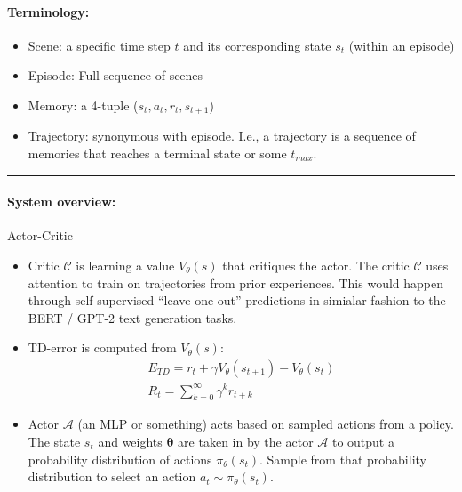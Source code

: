 \documentclass[11pt]{article}
\newcommand{\suml}{\sum\limits}
\begin{document}
\lhead{}
\rhead{}


\paragraph*{Terminology: }
\begin{itemize}
  \item Scene: a specific time step $t$ and its corresponding state $s_t$ (within an episode)
  \item Episode: Full sequence of scenes
  \item Memory: a 4-tuple ($s_t, a_t, r_t, s_{t+1}$)
  \item Trajectory: synonymous with episode. I.e., a trajectory is a sequence of memories that reaches a terminal state or some $t_{max}$.  
\end{itemize}

\hrule

\paragraph{System overview:} 

Actor-Critic  

\begin{itemize}
  \item Critic $\mathcal{C}$ is learning a value $V_\theta (s)$ that critiques the actor. The critic $\mathcal{C}$ uses attention to train on trajectories from prior experiences. This would happen through self-supervised ``leave one out'' predictions in simialar fashion to the BERT / GPT-2 text generation tasks.  
  \item TD-error is computed from $V_\theta (s)$:
    \begin{gather*}
      E_{TD} = r_t + \gamma V_\theta(s_{t+1}) - V_\theta(s_t) \\
      R_t = \suml_{k=0}^\infty \gamma^k r_{t+k}
    \end{gather*}
  
  \item Actor $\mathcal{A}$ (an MLP or something) acts based on sampled actions from a policy. The state $s_t$ and weights $\bm{\theta}$ are taken in by the actor $\mathcal{A}$ to output a probability distribution of actions $\pi_\theta (s_t)$. Sample from that probability distribution to select an action $a_t \sim \pi_\theta(s_t)$. 
\end{itemize}
\end{document}
